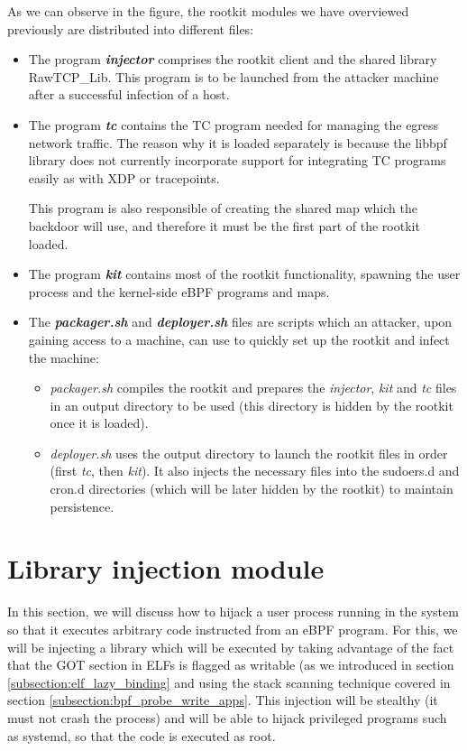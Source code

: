 As we can observe in the figure, the rootkit modules we have overviewed previously are distributed into different files:
\begin{itemize}
\item The program \textit{\textbf{injector}} comprises the rootkit client and the shared library RawTCP\_Lib. This program is to be launched from the attacker machine after a successful infection of a host.
\item The program \textit{\textbf{tc}} contains the TC program needed for managing the egress network traffic. The reason why it is loaded separately is because the libbpf library does not currently incorporate support for integrating TC programs easily as with XDP or tracepoints.

This program is also responsible of creating the shared map which the backdoor will use, and therefore it must be the first part of the rootkit loaded.
\item The program \textit{\textbf{kit}} contains most of the rootkit functionality, spawning the user process and the kernel-side eBPF programs and maps.
\item The \textit{\textbf{packager.sh}} and \textit{\textbf{deployer.sh}} files are scripts which an attacker, upon gaining access to a machine, can use to quickly set up the rootkit and infect the machine:
\begin{itemize}
	\item \textit{packager.sh} compiles the rootkit and prepares the \textit{injector}, \textit{kit} and \textit{tc} files in an output directory to be used (this directory is hidden by the rootkit once it is loaded).
	\item \textit{deployer.sh} uses the output directory to launch the rootkit files in order (first \textit{tc}, then \textit{kit}). It also injects the necessary files into the sudoers.d and cron.d directories (which will be later hidden by the rootkit) to maintain persistence.
\end{itemize}
\end{itemize}



\section{Library injection module} \label{section:lib_injection}
In this section, we will discuss how to hijack a user process running in the system so that it executes arbitrary code instructed from an eBPF program. For this, we will be injecting a library which will be executed by taking advantage of the fact that the GOT section in ELFs is flagged as writable (as we introduced in section \ref{subsection:elf_lazy_binding} and using the stack scanning technique covered in section \ref{subsection:bpf_probe_write_apps}. This injection will be stealthy (it must not crash the process) and will be able to hijack privileged programs such as systemd, so that the code is executed as root.

